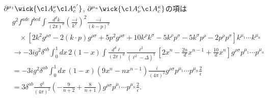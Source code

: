 $\partial^{\mu_1} \wick{\c1{A}^\nu_c \c1{A}_c^{\kappa'}}$, $\partial^{\mu_n} \wick{\c1{A}_\nu^c \c1{A}_c^\kappa}$の項は
\begin{align*}
  & g^2 f^{adc} f^{bcd} \int \frac{d^dk}{(2\pi)^d} \left( \frac{-i}{k^2} \right)^2 \frac{-i}{(k-p)^2} \\
  &\quad\times [2k^2 g^{\rho\sigma} - 2 (k\cdot p) g^{\rho\sigma} + 5 p^2 g^{\rho\sigma} + 10 k^\rho k^\sigma - 5 k^\rho p^\sigma - 5 k^\sigma p^\rho - 2 p^\rho p^\sigma]
  k^{\mu_1} \cdots k^{\mu_n} \\
  &\to -3 ig^2 \delta^{ab} \int_0^1 dx \, 2(1-x) \int\frac{d^d\ell}{(2\pi)^d} \frac{\ell^2}{(\ell^2 - \Delta)^3}
  \left[ 2 x^n - \frac{2n}{d} x^{n-1} + \frac{10}{d} x^n \right] g^{\rho\sigma} p^{\mu_1} \cdots p^{\mu_n} \\
  &= -3 ig^2 \delta^{ab} \int_0^1 dx \, (1-x) (9x^n - nx^{n-1}) \frac{i}{(4\pi)^2} g^{\rho\sigma} p^{\mu_1} \cdots p^{\mu_n} \frac{2}{\epsilon} \\
  &= 3 \delta^{ab} \frac{g^2}{(4\pi)^2} \left(-\frac{9}{n+2} + \frac{8}{n+1}\right) g^{\rho\sigma} p^{\mu_1} \cdots p^{\mu_n} \frac{2}{\epsilon} .
\end{align*}

